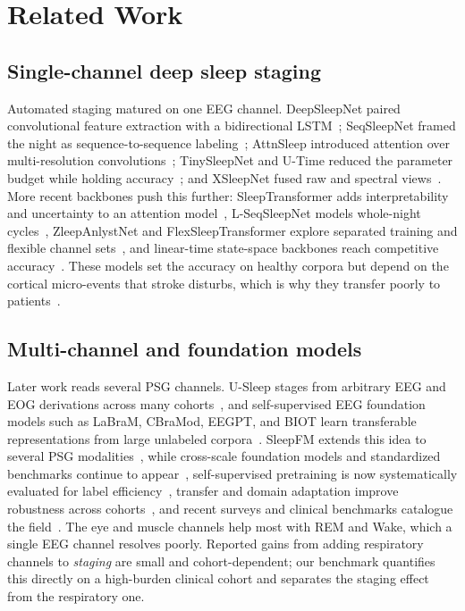 \documentclass[journal]{IEEEtran}
\begin{document}
\section{Related Work}
\label{sec:related}

\subsection{Single-channel deep sleep staging}
Automated staging matured on one EEG channel. DeepSleepNet paired convolutional feature
extraction with a bidirectional LSTM~\cite{supratak2017deepsleepnet}; SeqSleepNet framed the
night as sequence-to-sequence labeling~\cite{phan2019seqsleepnet}; AttnSleep introduced
attention over multi-resolution convolutions~\cite{eldele2021attnsleep}; TinySleepNet and
U-Time reduced the parameter budget while holding
accuracy~\cite{supratak2020tinysleepnet,perslev2019utime}; and XSleepNet fused raw and
spectral views~\cite{phan2021xsleepnet}. More recent backbones push this further: SleepTransformer
adds interpretability and uncertainty to an attention model~\cite{sleeptransformer2022}, L-SeqSleepNet
models whole-night cycles~\cite{lseqsleepnet2023}, ZleepAnlystNet and FlexSleepTransformer explore
separated training and flexible channel sets~\cite{jirakittayakorn2024zleep,guo2024flexsleep}, and
linear-time state-space backbones reach competitive accuracy~\cite{gu2023mamba,bitmamsleep2024}.
These models set the accuracy on healthy corpora but
depend on the cortical micro-events that stroke disturbs, which is why they transfer poorly to
patients~\cite{bose2026gap}.

\subsection{Multi-channel and foundation models}
Later work reads several PSG channels. U-Sleep stages from arbitrary EEG and EOG derivations
across many cohorts~\cite{perslev2021usleep}, and self-supervised EEG foundation models such
as LaBraM, CBraMod, EEGPT, and BIOT learn transferable representations from large unlabeled
corpora~\cite{labram2024,cbramod2025,eegpt2024,biot2023}. SleepFM extends this idea to several
PSG modalities~\cite{sleepfm2026}, while cross-scale foundation models and standardized
benchmarks continue to appear~\cite{csbrain2025,neuroatlas2026,sleepyland2026}, self-supervised
pretraining is now systematically evaluated for label efficiency~\cite{estevan2025ssl}, transfer
and domain adaptation improve robustness across cohorts~\cite{guillot2023transfer}, and recent
surveys and clinical benchmarks catalogue the field~\cite{yang2026review,hanif2025insomnia}. The eye and muscle channels help most with REM and Wake,
which a single EEG channel resolves poorly. Reported gains from adding respiratory channels to
\emph{staging} are small and cohort-dependent; our benchmark quantifies this directly on a
high-burden clinical cohort and separates the staging effect from the respiratory one.
\end{document}
